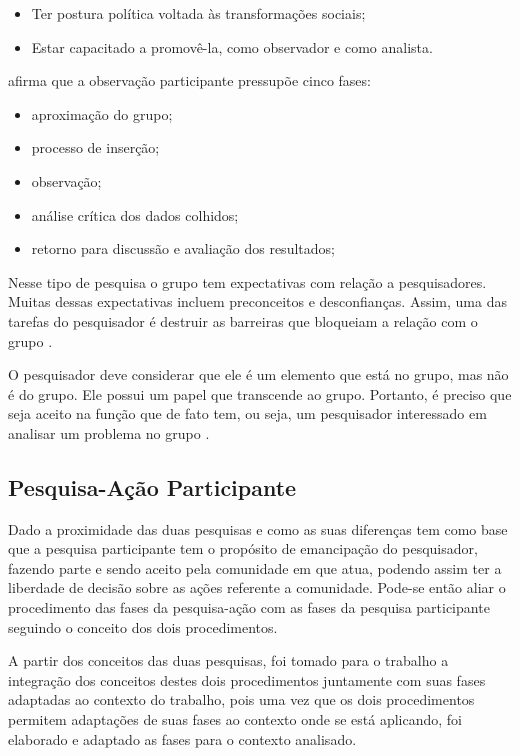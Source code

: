\begin{itemize}
	\item Ter postura política voltada às transformações sociais; 
	\item Estar capacitado a promovê-la, como observador e como analista.
\end{itemize}

 afirma que a observação participante pressupõe cinco fases:

\begin{itemize}
	\item aproximação do grupo;
	\item processo de inserção;
	\item observação;
	\item análise crítica dos dados colhidos;
	\item retorno para discussão e avaliação dos resultados;
\end{itemize}

Nesse tipo de pesquisa o grupo tem expectativas com relação a pesquisadores. Muitas dessas expectativas incluem preconceitos e desconfianças. Assim, uma das tarefas do pesquisador é destruir as barreiras que bloqueiam a relação com o grupo \cite{costaSantosTrevisan}.

O pesquisador deve considerar que ele é um elemento que está no grupo, mas não é do grupo. Ele possui um papel que transcende ao grupo. Portanto, é preciso que seja aceito na função que de fato tem, ou seja, um pesquisador interessado em analisar um problema no grupo \cite{costaSantosTrevisan}.

\subsection{Pesquisa-Ação Participante}

Dado a proximidade das duas pesquisas e como as suas diferenças tem como base que a pesquisa participante tem o propósito de emancipação do pesquisador, fazendo parte e sendo aceito pela comunidade em que atua, podendo assim ter a liberdade de decisão sobre as ações referente a comunidade. Pode-se então aliar o procedimento das fases da pesquisa-ação com as fases da pesquisa participante seguindo o conceito dos dois procedimentos.

A partir dos conceitos das duas pesquisas, foi tomado para o trabalho a integração dos conceitos destes dois procedimentos juntamente com suas fases adaptadas ao contexto do trabalho, pois uma vez que os dois procedimentos permitem adaptações de suas fases ao contexto onde se está aplicando, foi elaborado e adaptado as fases para o contexto analisado. 

